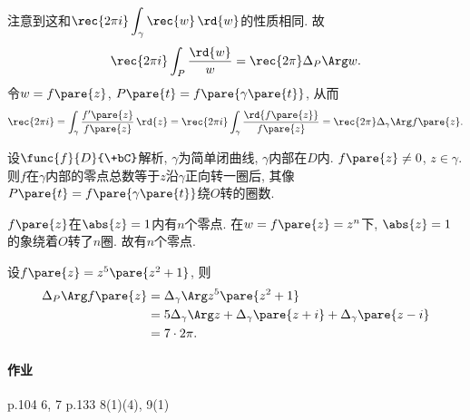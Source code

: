\documentclass[../ComplexVariable.tex]{subfiles}
\begin{document}
注意到这和$\displaystyle \rec{2\pi i} \int_\gamma \rec{w}\,\rd{w}$的性质相同. 故
\[ \rec{2\pi i}\int_P \frac{\rd{w}}{w} = \rec{2\pi}\Delta_P \Arg w. \]
令$w = f\pare{z}$, $P\pare{t} = f\pare{\gamma\pare{t}}$, 从而
\[ \rec{2\pi i} = \int_\gamma \frac{f'\pare{z}}{f\pare{z}}\,\rd{z} = \rec{2\pi i} \int_\gamma \frac{\rd{f\pare{z}}}{f\pare{z}} = \rec{2\pi}\Delta_\gamma \Arg f\pare{z}. \]
\begin{figure}[ht]
    \centering
\end{figure}
\begin{theorem}[辐角原理]
    设$\func{f}{D}{\+bC}$解析, $\gamma$为简单闭曲线, $\gamma$内部在$D$内. $f\pare{z}\neq 0$, $z\in\gamma$. 则$f$在$\gamma$内部的零点总数等于$z$沿$\gamma$正向转一圈后, 其像$P\pare{t} = f\pare{\gamma\pare{t}}$绕$O$转的圈数.
\end{theorem}
\begin{sample}
    \begin{ex}
        $f\pare{z}$在$\abs{z} = 1$内有$n$个零点. 在$w = f\pare{z} = z^n$下, $\abs{z} = 1$的象绕着$O$转了$n$圈. 故有$n$个零点.
    \end{ex}
    \begin{ex}
        设$f\pare{z} = z^5\pare{z^2+1}$, 则
        \begin{align*}
            \Delta_P \Arg f\pare{z} &= \Delta_\gamma \Arg z^5\pare{z^2+1} \\
            &= 5 \Delta_\gamma \Arg z + \Delta_\gamma \pare{z+i} + \Delta_\gamma \pare{z-i} \\
            &= 7\cdot 2\pi.
        \end{align*}
    \end{ex}
\end{sample}

\paragraph{作业} %
\label{par:作业}

p.104 6, 7 p.133 8(1)(4), 9(1)

\end{document}
